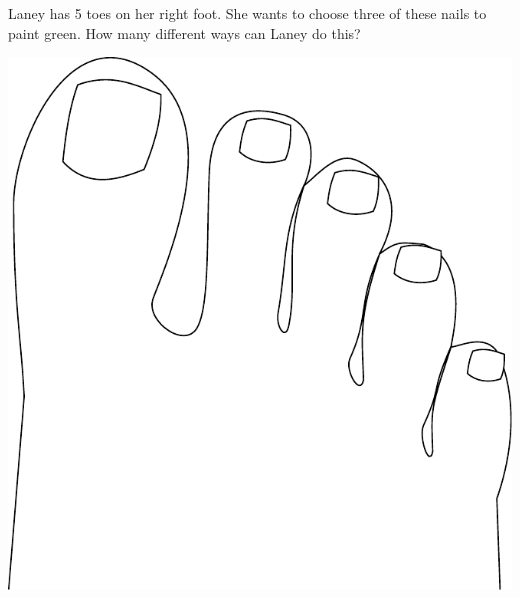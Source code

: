 \begin{frame}
Laney has 5 toes on her right foot. She wants to choose three  of these nails to paint green. How many different ways can Laney do this?
\begin{center}
\includegraphics[scale=0.3]{3-4_binomial_distribution/figures/toes/toes.pdf}
\end{center}
\pause


\end{frame} 



